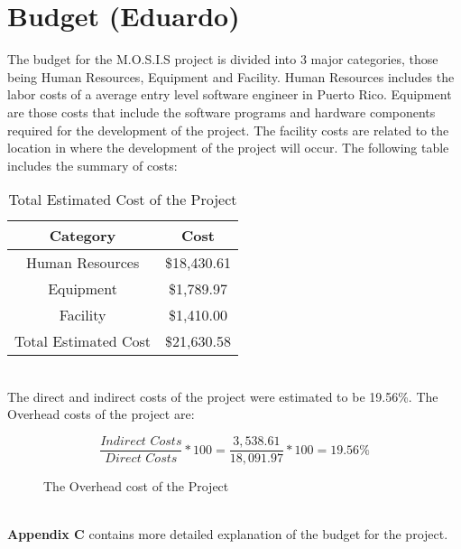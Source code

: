 
 \section{Budget (Eduardo)}
 The budget for the M.O.S.I.S project is divided into 3 major categories, those being Human Resources, Equipment and Facility. Human Resources includes the labor costs of a average entry level software engineer in Puerto Rico\cite{SoftwareEngineerSalary}. Equipment are those costs that include the software programs and hardware components required for the development of the project. The facility costs are related to the location in where the development of the project will occur. The following table includes the summary of costs:
 \begin{table}[h]
    \centering
    \begin{tabular}{||c | c||} 
     \hline
     Category & Cost \\ [0.5ex] 
     \hline\hline
     Human Resources & \$18,430.61\\ 
     \hline
     Equipment & \$1,789.97\\
     \hline
     Facility & \$1,410.00\\
     \hline
     Total Estimated Cost & \$21,630.58 \\
     \hline
    \end{tabular}
    \caption {Total Estimated Cost of the Project}
    \label {table:1}
\end{table}
\\ The direct and indirect costs of the project were estimated to be 19.56\%. The Overhead costs of the project are:
\begin{figure}[h]
   $$\frac{\textit{Indirect Costs}}{\textit{Direct Costs}} * 100 = \frac{3,538.61}{18,091.97} * 100 = 19.56\%$$
\caption{The Overhead cost of the Project}
\end{figure}
\\\textbf{Appendix C} contains more detailed explanation of the budget for the project.